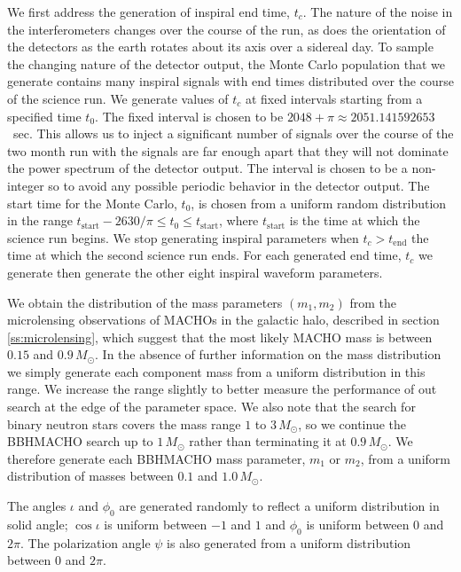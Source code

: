 We first address the generation of inspiral end time, $t_c$. The nature of the
noise in the interferometers changes over the course of the run, as does the
orientation of the detectors as the earth rotates about its axis over a
sidereal day. To sample the changing nature of the detector output, the Monte
Carlo population that we generate contains many inspiral signals with end
times distributed over the course of the science run. We generate values of
$t_c$ at fixed intervals starting from a specified time $t_0$. The fixed
interval is chosen to be $2048+\pi \approx 2051.141592653$~sec. This
allows us to inject a significant number of signals over the course of the two
month run with the signals are far enough apart that they will not dominate
the power spectrum of the detector output. The interval is chosen to be a
non-integer so to avoid any possible periodic behavior in the detector output.
The start time for the Monte Carlo, $t_0$, is chosen from a uniform random
distribution in the range $t_\mathrm{start} - 2630/\pi \le t_0 \le
t_\mathrm{start}$, where $t_\mathrm{start}$ is the time at which the science
run begins. We stop generating inspiral parameters when $t_c > t_\mathrm{end}$
the time at which the second science run ends. For each generated end time,
$t_c$ we generate then generate the other eight inspiral waveform parameters.

We obtain the distribution of the mass parameters $(m_1,m_2)$ from the
microlensing observations of MACHOs in the galactic halo, described in section
\ref{ss:microlensing}, which suggest that the most likely MACHO mass is between
$0.15$ and $0.9\,M_\odot$. In the absence of further information on the mass
distribution we simply generate each component mass from a uniform
distribution in this range. We increase the range slightly to better measure
the performance of out search at the edge of the parameter space. We also note
that the search for binary neutron stars covers the mass range $1$ to
$3\,M_\odot$, so we continue the BBHMACHO search up to $1\,M_\odot$ rather
than terminating it at $0.9\,M_\odot$. We therefore generate each BBHMACHO
mass parameter, $m_1$ or $m_2$, from a uniform distribution of masses between
$0.1$ and $1.0\,M_\odot$.

The angles $\iota$ and $\phi_0$ are generated randomly to reflect a uniform
distribution in solid angle; $\cos \iota$ is uniform between $-1$ and $1$ and
$\phi_0$ is uniform between $0$ and $2\pi$. The polarization angle $\psi$ is
also generated from a uniform distribution between $0$ and $2\pi$.

